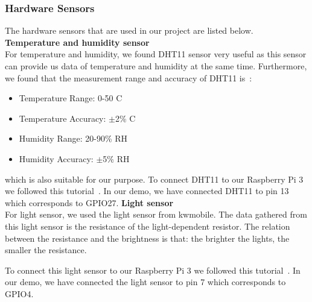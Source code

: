 \documentclass[runningheads]{llncs}
\begin{document}
\subsubsection{Hardware Sensors}\hfill
\label{hard_imp:sensor}
\newline
The hardware sensors that are used in our project are listed below.
\newline
\textbf{Temperature and humidity sensor~\cite{th_sensor}}\\
For temperature and humidity, we found DHT11 sensor very useful as this sensor can provide us data of temperature and humidity at the same time. Furthermore, we found that the measurement range and accuracy of DHT11 is~\cite{th_data}:
\begin{itemize}
\item Temperature Range: 0-50 \textdegree{}C
\item Temperature Accuracy: $\pm$2\% \textdegree{}C 
\item Humidity Range: 20-90\% RH
\item Humidity Accuracy: $\pm$5\% RH
\end{itemize}
which is also suitable for our purpose. To connect DHT11 to our Raspberry Pi 3 we followed this tutorial~\cite{th_tutorial}. In our demo, we have connected DHT11 to pin 13 which corresponds to GPIO27.
\newline
\textbf{Light sensor~\cite{l_sensor}}\\
For light sensor, we used the light sensor from kwmobile. The data gathered from this light sensor is the resistance of the light-dependent resistor. The relation between the resistance and the brightness is that: the brighter the lights, the smaller the resistance.

To connect this light sensor to our Raspberry Pi 3 we followed this tutorial~\cite{l_tutorial}. In our demo, we have connected the light sensor to pin 7 which corresponds to GPIO4.
\end{document}
